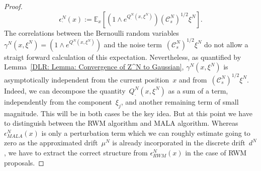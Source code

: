 \begin{proof}
\begin{equation}
   \epsilon_{\cdot}^N (x) := \mathbb{E}_x[ (1 \wedge e^{Q^N_{\cdot}(x, \xi^N)}) (\mathcal{C}_s^N)^{1/2} \xi^N].
 \end{equation}
 The correlations between the Bernoulli random variables~$\gamma^N(x, \xi^N)=(1 \wedge e^{Q^N_{\cdot}(x, \xi^N)})$ and the noise term~$ (\mathcal{C}_s^N)^{1/2} \xi^N$ do not allow a straigt forward calculation of this expectation. Nevertheless, as quantified by Lemma~\ref{DLR: Lemma: Convergence of Z^N to Gaussian}, $\gamma^N(x, \xi^N)$ is asymptotically independent from the current position~$x$ and from~$ (\mathcal{C}_s^N)^{1/2} \xi^N$. Indeed, we can decompose the quantity~$Q^N_{\cdot}(x, \xi^N)$ as a sum of a term, independently from the component~$\xi_j$, and another remaining term of small magnitude. This will be in both cases be the key idea. But at this point we have to distinguish between the RWM algorithm and MALA algorithm. Whereas $\epsilon_{MALA}^N (x)$ is only a perturbation term which we can roughly estimate going to zero as the approximated drift~$\mu^N$ is already incorporated in the discrete drift~$d^N$, we have to extract the correct structure from $\epsilon_{RWM}^N (x)$ in the case of RWM proposals.
 \newline
 

\end{proof}
